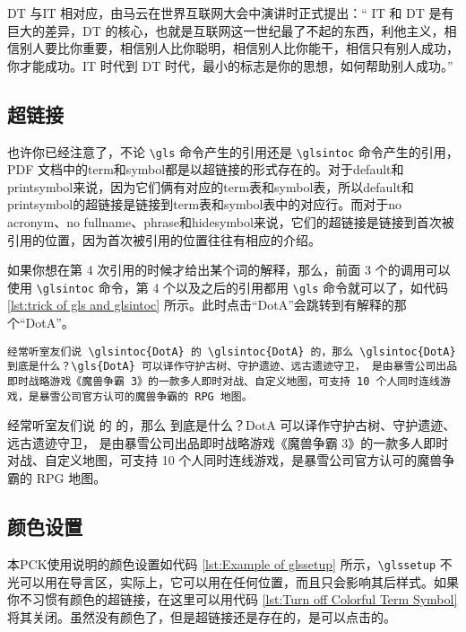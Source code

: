 \documentclass{article}
\begin{document}
\gls{DT} 与\gls{IT} 相对应，由马云在世界互联网大会中演讲时正式提出：`` \gls{IT} 和 \gls{DT} 是有巨大的差异，\gls{DT} 的核心，也就是互联网这一世纪最了不起的东西，利他主义，相信别人要比你重要，相信别人比你聪明，相信别人比你能干，相信只有别人成功，你才能成功。\gls{IT} 时代到 \gls{DT} 时代，最小的标志是你的思想，如何帮助别人成功。''

\subsection{超链接}
也许你已经注意了，不论 \lstinline{\gls} 命令产生的引用还是 \lstinline{\glsintoc} 命令产生的引用，PDF 文档中的\gls{term}和\gls{symbol}都是以超链接的形式存在的。对于\gls{default}和\gls{printsymbol}来说，因为它们俩有对应的\gls{term}表和\gls{symbol}表，所以\gls{default}和\gls{printsymbol}的超链接是链接到\gls{term}表和\gls{symbol}表中的对应行。而对于\gls{no acronym}、\gls{no fullname}、\gls{phrase}和\gls{hidesymbol}来说，它们的超链接是链接到首次被引用的位置，因为首次被引用的位置往往有相应的介绍。

如果你想在第 4 次引用的时候才给出某个词的解释，那么，前面 3 个的调用可以使用 \lstinline{\glsintoc} 命令，第 4 个以及之后的引用都用 \lstinline{\gls} 命令就可以了，如代码 \ref{lst:trick of gls and glsintoc} 所示。此时点击``DotA''会跳转到有解释的那个``DotA''。
\begin{lstlisting}[style      = latexcode,
                   caption    = {\texttt{\backslash gls} 与 \texttt{\backslash glsintoc} 的灵活使用},
                   label      = {lst:trick of gls and glsintoc},
                   showspaces = true]
经常听室友们说 \glsintoc{DotA} 的 \glsintoc{DotA} 的，那么 \glsintoc{DotA} 到底是什么？\gls{DotA} 可以译作守护古树、守护遗迹、远古遗迹守卫， 是由暴雪公司出品即时战略游戏《魔兽争霸 3》的一款多人即时对战、自定义地图，可支持 10 个人同时连线游戏，是暴雪公司官方认可的魔兽争霸的 RPG 地图。
\end{lstlisting}

经常听室友们说  的  的，那么  到底是什么？\gls{DotA} 可以译作守护古树、守护遗迹、远古遗迹守卫， 是由暴雪公司出品即时战略游戏《魔兽争霸 3》的一款多人即时对战、自定义地图，可支持 10 个人同时连线游戏，是暴雪公司官方认可的魔兽争霸的 RPG 地图。

\subsection{颜色设置}
本\gls{PCK}使用说明的颜色设置如代码 \ref{lst:Example of glssetup} 所示，\lstinline{\glssetup} 不光可以用在导言区，实际上，它可以用在任何位置，而且只会影响其后样式。如果你不习惯有颜色的超链接，在这里可以用代码 \ref{lst:Turn off Colorful Term Symbol} 将其关闭。虽然没有颜色了，但是超链接还是存在的，是可以点击的。
\end{document}
